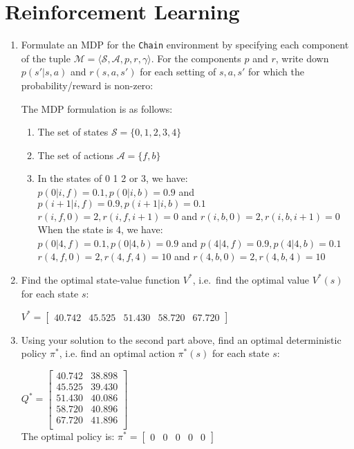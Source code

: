 \section{Reinforcement Learning}

\begin{enumerate}
\item 
Formulate an MDP for the \texttt{Chain} environment by specifying each component of the tuple $\mathcal{M} = \langle \mathcal{S},\mathcal{A},p,r,\gamma \rangle$. For the components $p$ and $r$, write down $p(s'|s,a)$ and $r(s,a,s')$ for each setting of $s,a,s'$ for which the probability/reward is non-zero:

The MDP formulation is as follows:
\begin{enumerate}
\item The set of states $\mathcal{S} = \{0,1,2,3,4\}$
\item The set of actions $\mathcal{A} = \{f,b\}$
\item In the states of 0 1 2 or 3, we have:\\

$p(0|i,f) = 0.1, p(0|i,b) = 0.9$ and $ p(i+1|i,f) = 0.9, p(i+1|i,b) = 0.1$\\
$r(i,f,0) = 2, 
r(i,f,i+1) = 0$ and $r(i,b,0) = 2, r(i,b,i+1) = 0$\\

When the state is 4, we have:\\

$p(0|4,f) = 0.1, p(0|4,b) = 0.9$ and $p(4|4,f) = 0.9, p(4|4,b) = 0.1$\\
$r(4,f,0) = 2, r(4,f,4) = 10$ and $r(4,b,0) = 2, r(4,b,4) = 10$
\end{enumerate}

\item
Find the optimal state-value function $V^*$, i.e.\ find the optimal value $V^*(s)$ for each state $s$:

$
V^* = 
\begin{bmatrix}
40.742& 45.525& 51.430& 58.720& 67.720
\end{bmatrix}
$\\

\item
Using your solution to the second part above, find an optimal deterministic policy $\pi^*$, i.e. find an optimal action $\pi^*(s)$ for each state $s$:

$ 
Q^* = 
\begin{bmatrix}
   40.742 & 38.898\\
   45.525 & 39.430\\
   51.430 & 40.086\\
   58.720 & 40.896\\
   67.720 & 41.896\\
\end{bmatrix}
$\\

The optimal policy is: 
$
\pi^{*} = 
\begin{bmatrix}
0&0&0&0&0
\end{bmatrix}
$\\
\end{enumerate}


